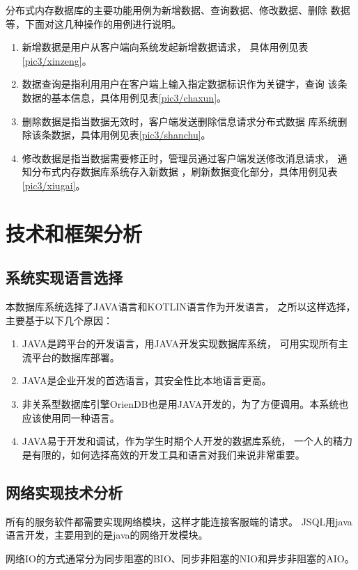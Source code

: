 分布式内存数据库的主要功能用例为新增数据、查询数据、修改数据、删除
数据等，下面对这几种操作的用例进行说明。
\begin{enumerate}
	\item 新增数据是用户从客户端向系统发起新增数据请求，
	具体用例见表\ref{pic3/xinzeng}。
	\item 数据查询是指利用用户在客户端上输入指定数据标识作为关键字，查询
	该条数据的基本信息，具体用例见表\ref{pic3/chaxun}。
\item 	删除数据是指当数据无效时，客户端发送删除信息请求分布式数据
	库系统删除该条数据，具体用例见表\ref{pic3/shanchu}。
\item 	修改数据是指当数据需要修正时，管理员通过客户端发送修改消息请求，
	通知分布式内存数据库系统存入新数据
	，刷新数据变化部分，具体用例见表\ref{pic3/xiugai}。
\end{enumerate}
\section{技术和框架分析}
\subsection{系统实现语言选择}
本数据库系统选择了JAVA语言和KOTLIN语言作为开发语言，
之所以这样选择，主要基于以下几个原因：
\begin{enumerate}
	\item JAVA是跨平台的开发语言，用JAVA开发实现数据库系统，
	可用实现所有主流平台的数据库部署。
	\item JAVA是企业开发的首选语言，其安全性比本地语言更高。
	\item 非关系型数据库引擎OrienDB也是用JAVA开发的，为了方便调用。本系统也应该使用同一种语言。
	\item JAVA易于开发和调试，作为学生时期个人开发的数据库系统，
	一个人的精力是有限的，如何选择高效的开发工具和语言对我们来说非常重要。
\end{enumerate}
\subsection{网络实现技术分析}
所有的服务软件都需要实现网络模块，这样才能连接客服端的请求。
JSQL用java语言开发，主要用到的是java的网络开发模块。

网络IO的方式通常分为同步阻塞的BIO、同步非阻塞的NIO和异步非阻塞的AIO。

